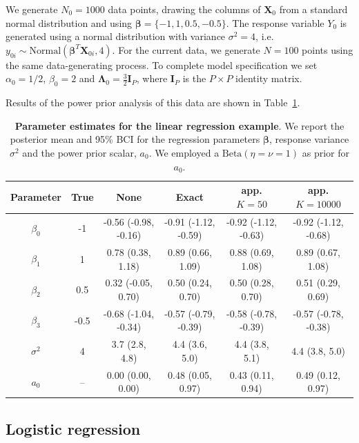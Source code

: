 \documentclass[a4paper, notitlepage, 11pt]{article}
\begin{document}
We generate $N_0 = 1000$ data points, drawing the columns of $\boldsymbol X_0$ from a standard normal distribution and using $\boldsymbol \beta = \{ -1, 1, 0.5, -0.5\}$.
The response variable $Y_0$ is generated using a normal distribution with variance $\sigma^2 = 4$, i.e. $y_{0i} \sim \text{Normal}(\boldsymbol\beta^T \boldsymbol X_{0i}, 4)$.
For the current data, we generate $N = 100$ points using the same data-generating process.
To complete model specification we set $\alpha_0 = 1/2$, $\beta_0 = 2$ and $\boldsymbol\Lambda_0 = \frac{3}{2}\boldsymbol I_P$, where $\boldsymbol I_P$ is the $P \times P$ identity matrix.

Results of the power prior analysis of this data are shown in Table~\ref{tab:results_NIGregression}.

\begin{table}[!ht]
\label{tab:results_NIGregression}
\caption{\textbf{Parameter estimates for the linear regression example}.
We report the posterior mean and 95\% BCI for the regression parameters $\boldsymbol\beta$, response variance $\sigma^2$ and the power prior scalar, $a_0$.
We employed a  $\text{Beta}(\eta = \nu = 1)$ as prior for $a_0$.
}
\begin{tabular}{cccccc}
\hline 
 Parameter & True & None & Exact & app. $K = 50$ & app. $K = 10000$ \\
 \hline
$\beta_0$ & -1 & -0.56 (-0.98, -0.16) & -0.91 (-1.12, -0.59) & -0.92 (-1.12, -0.63) & -0.92 (-1.12, -0.68) \\
$\beta_1$ & 1 & 0.78 (0.38, 1.18) & 0.89 (0.66, 1.09) & 0.88 (0.69, 1.08) & 0.89 (0.67, 1.08) \\
$\beta_2$ & 0.5 & 0.32 (-0.05, 0.70) & 0.50 (0.24, 0.70) & 0.50 (0.28, 0.70) & 0.51 (0.29, 0.69) \\
$\beta_3$ & -0.5 & -0.68 (-1.04, -0.34) & -0.57 (-0.79, -0.39) & -0.58 (-0.78, -0.39) & -0.57 (-0.78, -0.38) \\
$\sigma^2$ & 4 & 3.7 (2.8, 4.8) & 4.4 (3.6, 5.0) & 4.4 (3.8, 5.1) & 4.4 (3.8, 5.0) \\
$a_0$ & -- & 0.00 (0.00, 0.00) & 0.48 (0.05, 0.97) &0.43 (0.11, 0.94) & 0.49 (0.12, 0.97)\\
\hline
\end{tabular}
\end{table}

\subsection{Logistic regression}
\label{sec:logistic_regression}
\end{document}
